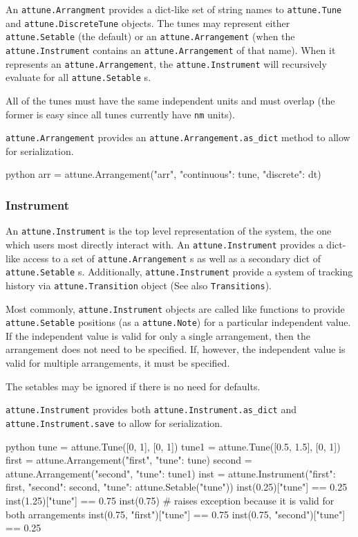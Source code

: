 An \texttt{attune.Arrangment} provides a dict-like set
of string names to \texttt{attune.Tune} and
\texttt{attune.DiscreteTune} objects. The tunes may
represent either \texttt{attune.Setable} (the default)
or an \texttt{attune.Arrangement} (when the
\texttt{attune.Instrument} contains an
\texttt{attune.Arrangement} of that name). When it
represents an \texttt{attune.Arrangement}, the
\texttt{attune.Instrument} will recursively evaluate
for all \texttt{attune.Setable} s.

All of the tunes must have the same independent units and must overlap
(the former is easy since all tunes currently have \texttt{nm} units).

\texttt{attune.Arrangement} provides an
\texttt{attune.Arrangement.as\_dict} method to allow
for serialization.

\begin{codefragment}{python}
arr = attune.Arrangement("arr", {"continuous": tune, "discrete": dt})
\end{codefragment}

\hypertarget{instrument}{%
\subsubsection{Instrument}\label{instrument}}

An \texttt{attune.Instrument} is the top level
representation of the system, the one which users most directly interact
with. An \texttt{attune.Instrument} provides a
dict-like access to a set of
\texttt{attune.Arrangement} s as well as a secondary
dict of \texttt{attune.Setable} s. Additionally,
\texttt{attune.Instrument} provide a system of tracking
history via \texttt{attune.Transition} object (See also
\texttt{Transitions}).

Most commonly, \texttt{attune.Instrument} objects are
called like functions to provide
\texttt{attune.Setable} positions (as a
\texttt{attune.Note}) for a particular independent
value. If the independent value is valid for only a single arrangement,
then the arrangement does not need to be specified. If, however, the
independent value is valid for multiple arrangements, it must be
specified.

The setables may be ignored if there is no need for defaults.

\texttt{attune.Instrument} provides both
\texttt{attune.Instrument.as\_dict} and
\texttt{attune.Instrument.save} to allow for
serialization.

\begin{codefragment}{python}
tune = attune.Tune([0, 1], [0, 1])
tune1 = attune.Tune([0.5, 1.5], [0, 1])
first = attune.Arrangement("first", {"tune": tune})
second = attune.Arrangement("second", {"tune": tune1})
inst = attune.Instrument({"first": first, "second": second}, {"tune": attune.Setable("tune")})
inst(0.25)["tune"] == 0.25
inst(1.25)["tune"] == 0.75
inst(0.75) # raises exception because it is valid for both arrangements
inst(0.75, "first")["tune"] == 0.75
inst(0.75, "second")["tune"] == 0.25
\end{codefragment}

